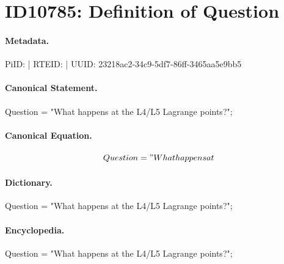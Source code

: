 \section*{ID10785: Definition of Question}
\paragraph{Metadata.}
PiID:  | RTEID:  | UUID: 23218ac2-34c9-5df7-86ff-3465aa5e9bb5

\paragraph{Canonical Statement.}
Question = "What happens at the L4/L5 Lagrange points?";

\paragraph{Canonical Equation.}
\[
Question = "What happens at
\]

\paragraph{Dictionary.}
Question = "What happens at the L4/L5 Lagrange points?";

\paragraph{Encyclopedia.}
Question = "What happens at the L4/L5 Lagrange points?";
